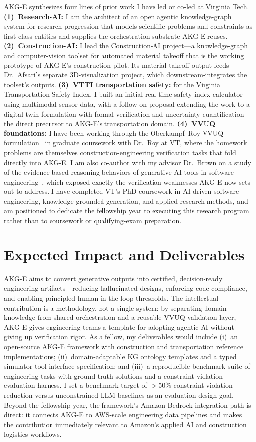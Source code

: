 \documentclass[conference, 10pt]{IEEEtran}
\begin{document}
AKG-E synthesizes four lines of prior work I have led or co-led at Virginia Tech. \textbf{(1)~Research-AI:} I am the architect of an open agentic knowledge-graph system for research progression that models scientific problems and constraints as first-class entities and supplies the orchestration substrate AKG-E reuses. \textbf{(2)~Construction-AI:} I lead the Construction-AI project---a knowledge-graph and computer-vision toolset for automated material takeoff that is the working prototype of AKG-E's construction pilot. Its material-takeoff output feeds Dr.~Afsari's separate 3D-visualization project, which downstream-integrates the toolset's outputs. \textbf{(3)~VTTI transportation safety:} for the Virginia Transportation Safety Index, I built an initial real-time safety-index calculator using multimodal-sensor data, with a follow-on proposal extending the work to a digital-twin formulation with formal verification and uncertainty quantification---the direct precursor to AKG-E's transportation domain. \textbf{(4)~VVUQ foundations:} I have been working through the Oberkampf--Roy VVUQ formulation~\cite{Oberkampf2010VVUQ} in graduate coursework with Dr.~Roy at VT, where the homework problems are themselves construction-engineering verification tasks that fold directly into AKG-E. I am also co-author with my advisor Dr.~Brown on a study of the evidence-based reasoning behaviors of generative AI tools in software engineering~\cite{BrownCusati2025SEBeliefs}, which exposed exactly the verification weaknesses AKG-E now sets out to address. I have completed VT's PhD coursework in AI-driven software engineering, knowledge-grounded generation, and applied research methods, and am positioned to dedicate the fellowship year to executing this research program rather than to coursework or qualifying-exam preparation.

\section*{Expected Impact and Deliverables}

AKG-E aims to convert generative outputs into certified, decision-ready engineering artifacts---reducing hallucinated designs, enforcing code compliance, and enabling principled human-in-the-loop thresholds. The intellectual contribution is a methodology, not a single system: by separating domain knowledge from shared orchestration and a reusable VVUQ validation layer, AKG-E gives engineering teams a template for adopting agentic AI without giving up verification rigor. As a fellow, my deliverables would include (i)~an open-source AKG-E framework with construction and transportation reference implementations; (ii)~domain-adaptable KG ontology templates and a typed simulator-tool interface specification; and (iii)~a reproducible benchmark suite of engineering tasks with ground-truth solutions and a constraint-violation evaluation harness. I set a benchmark target of $>$50\% constraint violation reduction versus unconstrained LLM baselines as an evaluation design goal. Beyond the fellowship year, the framework's Amazon-Bedrock integration path is direct: it connects AKG-E to AWS-scale engineering data pipelines and makes the contribution immediately relevant to Amazon's applied AI and construction logistics workflows.



\end{document}
